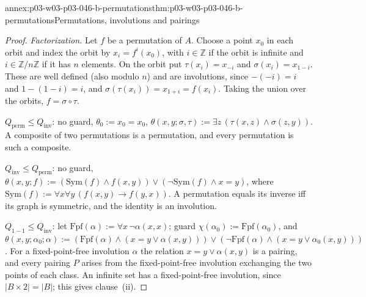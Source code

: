 \begin{annexitem}{annex:p03-w03-p03-046-b-permutations}{thm:p03-w03-p03-046-b-permutations}{Permutations, involutions and pairings}
\begin{proof}
\emph{Factorization.} Let \(f\) be a permutation of \(A\). Choose a point
\(x_0\) in each orbit and index the orbit by \(x_i=f^i(x_0)\), with
\(i\in\mathbb Z\) if the orbit is infinite and \(i\in\mathbb Z/n\mathbb Z\)
if it has \(n\) elements. On the orbit put \(\tau(x_i)=x_{-i}\) and
\(\sigma(x_i)=x_{1-i}\). These are well defined (also modulo \(n\)) and
are involutions, since \(-(-i)=i\) and \(1-(1-i)=i\), and
\(\sigma(\tau(x_i))=x_{1+i}=f(x_i)\). Taking the union over the orbits,
\(f=\sigma\circ\tau\).

\(Q_{\mathrm{perm}}\le Q_{\mathrm{inv}}\): no guard, \(\theta_0:=x_0=x_0\),
\(\theta(x,y;\sigma,\tau):=\exists z\,(\tau(x,z)\wedge\sigma(z,y))\). A
composite of two permutations is a permutation, and every permutation is
such a composite.

\(Q_{\mathrm{inv}}\le Q_{\mathrm{perm}}\): no guard,
\(\theta(x,y;f):=(\mathrm{Sym}(f)\wedge f(x,y))\vee(\neg\mathrm{Sym}(f)\wedge
x=y)\), where \(\mathrm{Sym}(f):=\forall x\forall y\,(f(x,y)\to f(y,x))\).
A permutation equals its inverse iff its graph is symmetric, and the
identity is an involution.

\(Q_{1-1}\le Q_{\mathrm{inv}}\): let \(\mathrm{Fpf}(\alpha):=\forall
x\,\neg\alpha(x,x)\); guard \(\chi(\alpha_0):=\mathrm{Fpf}(\alpha_0)\), and
\(\theta(x,y;\alpha_0;\alpha):=(\mathrm{Fpf}(\alpha)\wedge(x=y\vee\alpha(x,y)))\vee
(\neg\mathrm{Fpf}(\alpha)\wedge(x=y\vee\alpha_0(x,y)))\). For a
fixed-point-free involution \(\alpha\) the relation \(x=y\vee\alpha(x,y)\)
is a pairing, and every pairing \(P\) arises from the fixed-point-free
involution exchanging the two points of each class. An infinite set has a
fixed-point-free involution, since \(|B\times2|=|B|\); this gives
clause~(ii).


\end{proof}
\end{annexitem}
